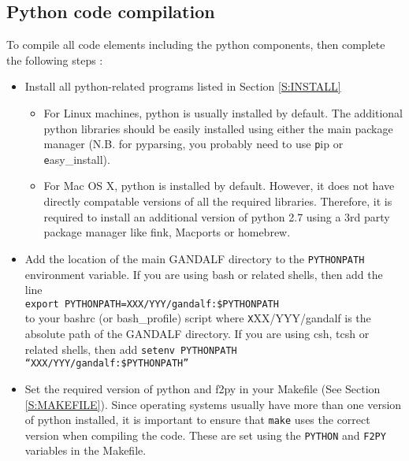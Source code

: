 \documentclass[a4paper]{article}
\newcommand{\var}[1]{\texttt{#1}}
\begin{document}
\subsection{Python code compilation}
To compile all code elements including the python components, then complete the following steps : 
\begin{itemize}

\item Install all python-related programs listed in Section \ref{S:INSTALL}

\begin{itemize}
\item For Linux machines, python is usually installed by default.  The additional python libraries should be easily installed using either the main package manager (N.B. for pyparsing, you probably need to use {\var pip} or {\var easy\_install}).
\item For Mac OS X, python is installed by default.  However, it does not have directly compatable versions of all the required libraries.  Therefore, it is required to install an additional version of python 2.7 using a 3rd party package manager like fink, Macports or homebrew.
\end{itemize}

\item Add the location of the main GANDALF directory to the \var{PYTHONPATH} environment variable.  If you are using bash or related shells, then add the line \\
\newline
\noindent \var{export PYTHONPATH=XXX/YYY/gandalf:\$PYTHONPATH} \\

\noindent to your bashrc (or bash\_profile) script where {\var XXX/YYY/gandalf} is the absolute path of the GANDALF directory.   If you are using csh, tcsh or related shells, then add
\newline
\noindent \var{setenv PYTHONPATH ``XXX/YYY/gandalf:\$PYTHONPATH''} \\

\item Set the required version of python and f2py in your Makefile (See Section \ref{S:MAKEFILE}).  Since operating systems usually have more than one version of python installed, it is important to ensure that \var{make} uses the correct version when compiling the code.  These are set using the \var{PYTHON} and \var{F2PY} variables in the Makefile.


\end{itemize}
\end{document}
